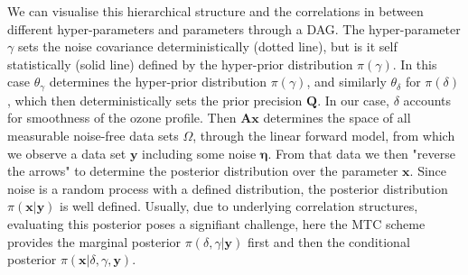 We can visualise this hierarchical structure and the correlations in between different hyper-parameters and parameters through a DAG.
The hyper-parameter $\gamma$ sets the noise covariance deterministically (dotted line), but is it self statistically (solid line) defined by the hyper-prior distribution $\pi(\gamma)$.
In this case $\theta_{\gamma}$ determines the hyper-prior distribution $\pi(\gamma)$, and similarly $\theta_{\delta}$ for $\pi(\delta)$, which then deterministically sets the prior precision $\bm{Q}$.
In our case, $\delta$ accounts for smoothness of the ozone profile.
Then $\bm{A}\bm{x}$ determines the space of all measurable noise-free data sets $\Omega$, through the linear forward model, from which we observe a data set $\bm{y}$ including some noise $\bm{\eta}$.
From that data we then "reverse the arrows" to determine the posterior distribution over the parameter $\bm{x}$.
Since noise is a random process with a defined distribution, the posterior distribution $\pi(\bm{x}|\bm{y})$ is well defined.
Usually, due to underlying correlation structures, evaluating this posterior poses a signifiant challenge, here the MTC scheme provides the marginal posterior $\pi(\delta, \gamma | \bm{y})$ first and then the conditional posterior $\pi(\bm{x}|\delta, \gamma,\bm{y})$.

